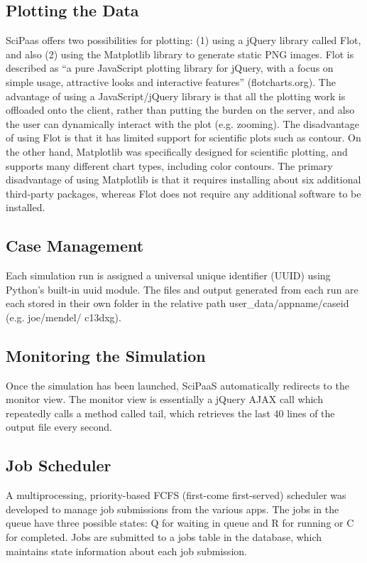 \documentclass[10pt,reprint]{socc14}
\begin{document}
\subsection{Plotting the Data}

SciPaas offers two possibilities for plotting: (1) using a jQuery library called Flot, and also (2) using the Matplotlib library to generate static PNG images. Flot is described as “a pure JavaScript plotting library for jQuery, with a focus on simple usage, attractive looks and interactive features”  (flotcharts.org).  The advantage of using a JavaScript/jQuery library is that all the plotting work is offloaded onto the client, rather than putting the burden on the server, and also the user can dynamically interact with the plot (e.g. zooming).  The disadvantage of using Flot is that it has limited support for scientific plots such as contour.  On the other hand, Matplotlib was specifically designed for scientific plotting, and supports many different chart types, including color contours.  The primary disadvantage of using Matplotlib is that it requires installing about six additional third-party packages, whereas Flot does not require any additional software to be installed.

\subsection{Case Management}

Each simulation run is assigned a universal unique identifier (UUID) using Python’s built-in uuid module.  The files and output generated from each run are each stored in their own folder in the relative path user\_data/appname/caseid (e.g. joe/mendel/ c13dxg).

\subsection{Monitoring the Simulation}

Once the simulation has been launched, SciPaaS automatically redirects to the monitor view.  The monitor view is essentially a jQuery AJAX call which repeatedly calls a method called tail, which retrieves the last 40 lines of the output file every second.

\subsection{Job Scheduler}

A multiprocessing, priority-based FCFS (first-come first-served) scheduler was developed to manage job submissions from the various apps.  The jobs in the queue have three possible states: Q for waiting in queue and R for running or C for completed.  Jobs are submitted to a jobs table in the database, which maintains state information about each job submission.
\end{document}
